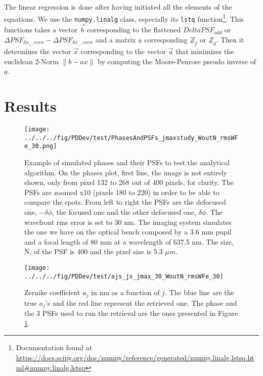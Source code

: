 The linear regression is done after having initiated all the elements of the equations. We use the \verb!numpy.linalg! class, especially its \verb!lstq! function\footnote{Documentation found at \url{https://docs.scipy.org/doc/numpy/reference/generated/numpy.linalg.lstsq.html\#numpy.linalg.lstsq}}. This functions takes a vector $\vec{b}$ corresponding to the flattened $Delta PSF_{odd}$ or $\Delta PSF_{\delta\phi_+, even}-\Delta PSF_{\delta\phi_-, even}$ and a matrix  $\underline{a}$ corresponding $\underline{Z}_f$ or $\underline{Z}_d$. Then it determines the vector $\vec{x}$ corresponding to the vector $\vec{a}$ that minimizes the euclidean 2-Norm $\lVert b-ax \rVert$ by computing the Moore-Penrose pseudo inverse of $\underline{a}$.

\section{Results}
\label{sec:ourPDresult}

\begin{figure}
\begin{center}
\texttt{[image: ../../../fig/PDDev/test/PhasesAndPSFs\_jmaxstudy\_WoutN\_rmsWFe\_30.png]}
\decoRule
\caption{Example of simulated phases and their PSFs to test the analytical algorithm. On the phases plot, first line, the image is not entirely shown, only from pixel 132 to 268 out of 400 pixels, for clarity. The PSFs are zoomed x10 (pixels 180 to 220) in order to be able to compare the spots. From left to right the PSFs are the defocused one, $-\delta\phi$, the focused one and the other defocused one, $\delta\phi$. The wavefront rms error is set to 30 nm. The imaging system simulates the one we have on the optical bench composed by a 3.6 mm pupil and a focal length of 80 mm at a wavelength of 637.5 nm. The size, N, of the PSF is 400 and the pixel size is 5.3 $\mu m$.}
\label{fig:simPhasesAndPSFs}
\end{center}
\end{figure}
 

\begin{figure}
\begin{center}
\texttt{[image: ../../../fig/PDDev/test/ajs\_js\_jmax\_30\_WoutN\_rmsWFe\_30]}
\decoRule
\caption{Zernike coefficient $a_j$ in nm as a function of $j$. The blue line are the true $a_j$'s and the red line represent the retrieved one. The phase and the 3 PSFs used to run the retrieval are the ones presented in Figure \ref{fig:simPhasesAndPSFs}.}
\label{fig:ajs_js_jmax_30_WoutN_rmsWFe_30}
\end{center}
\end{figure} 


